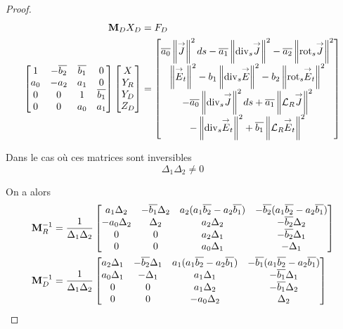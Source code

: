 \begin{proof}
    \begin{align*}
      \mathbf{M}_D  X_D & =  F_D
      \\
      \begin{bmatrix}
        1 & -{\overline{b_2}} & {\overline{b_1}} & 0
        \\
        a_0 & -a_2 & a_1 & 0
        \\
        0 & 0 & 1 & {\overline{b_1}}
        \\
        0 & 0 & a_0 & a_1
      \end{bmatrix}
      \begin{bmatrix}
        X
        \\
        Y_R
        \\
        Y_D
        \\
        Z_D
      \end{bmatrix}
      & =
      \begin{bmatrix}
        {\overline{a_0}} \left\lVert{\overset{\rightarrow}{J}}\right\rVert^2ds - {\overline{a_1}} \left\lVert{\operatorname{div}_s} {\overset{\rightarrow}{J}}\right\rVert^2 - {\overline{a_2}} \left\lVert{{\operatorname{rot}}_s} {\overset{\rightarrow}{J}}\right\rVert^2  \\
        \left\lVert{\overset{\rightarrow}{E}}_t\right\rVert^2   - b_1 \left\lVert{\operatorname{div}_s} {\overset{\rightarrow}{E}} \right\rVert^2  - b_2 \left\lVert{{\operatorname{rot}}_s} {\overset{\rightarrow}{E}}_t\right\rVert^2  \\
        -{\overline{a_0}} \left\lVert{\operatorname{div}_s} {\overset{\rightarrow}{J}}\right\rVert^2ds + {\overline{a_1}} \left\lVert{\mathcal{L}_R} {\overset{\rightarrow}{J}}\right\rVert^2  \\
        -\left\lVert{\operatorname{div}_s} {\overset{\rightarrow}{E}}_t\right\rVert^2   + {\overline{b_1}} \left\lVert{\mathcal{L}_R} {\overset{\rightarrow}{E}}_t\right\rVert^2 
      \end{bmatrix}
    \end{align*}

    Dans le cas où ces matrices sont inversibles
    \begin{equation*}
      \label{eq:unicite:ci3:csu3-cn-det}
      \Delta_1\Delta_2 \not = 0
    \end{equation*}

    On a alors
    \begin{align*}
      \mathbf{M}_R^{-1} & =\dfrac{1}{\Delta_1\Delta_2}
      \begin{bmatrix}
        a_1 \Delta_2 & -{\overline{b_1}}\Delta_2 & a_2(a_1{\overline{b_2}}-a_2{\overline{b_1}}) & -{\overline{b_2}}(a_1{\overline{b_2}}-a_2{\overline{b_1}})
        \\
        -a_0 \Delta_2 & \Delta_2 & a_2\Delta_2 & -{\overline{b_2}}\Delta_2
        \\
        0 & 0 & a_2\Delta_1 & -{\overline{b_2}}\Delta_1
        \\
        0 & 0 & a_0\Delta_1 & -\Delta_1
      \end{bmatrix}
      \\
      \mathbf{M}_D^{-1} & =\dfrac{1}{\Delta_1\Delta_2}
      \begin{bmatrix}
        a_2 \Delta_1 & -{\overline{b_2}}\Delta_1 & a_1(a_1{\overline{b_2}}-a_2{\overline{b_1}}) & -{\overline{b_1}}(a_1{\overline{b_2}}-a_2{\overline{b_1}})
        \\
        a_0 \Delta_1 & -\Delta_1 & a_1\Delta_1 & -{\overline{b_1}}\Delta_1
        \\
        0 & 0 & a_1\Delta_2 & -{\overline{b_1}}\Delta_2
        \\
        0 & 0 & -a_0\Delta_2 & \Delta_2
      \end{bmatrix}
    \end{align*}
    

\end{proof}
